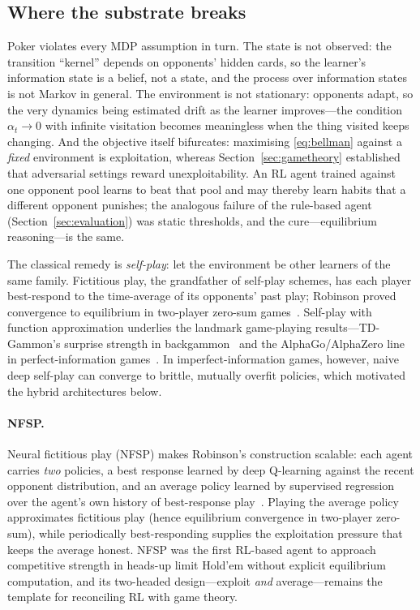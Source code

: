 \subsection{Where the substrate breaks}

Poker violates every MDP assumption in turn. The state is not observed: the transition ``kernel'' depends on opponents' hidden cards, so the learner's information state is a belief, not a state, and the process over information states is not Markov in general. The environment is not stationary: opponents adapt, so the very dynamics being estimated drift as the learner improves---the condition $\alpha_t \to 0$ with infinite visitation becomes meaningless when the thing visited keeps changing. And the objective itself bifurcates: maximising \eqref{eq:bellman} against a \emph{fixed} environment is exploitation, whereas Section~\ref{sec:gametheory} established that adversarial settings reward unexploitability. An RL agent trained against one opponent pool learns to beat that pool and may thereby learn habits that a different opponent punishes; the analogous failure of the rule-based agent (Section~\ref{sec:evaluation}) was static thresholds, and the cure---equilibrium reasoning---is the same.

The classical remedy is \emph{self-play}: let the environment be other learners of the same family. Fictitious play, the grandfather of self-play schemes, has each player best-respond to the time-average of its opponents' past play; Robinson proved convergence to equilibrium in two-player zero-sum games~\cite{robinson1951iterative}. Self-play with function approximation underlies the landmark game-playing results---TD-Gammon's surprise strength in backgammon~\cite{tesauro1995td} and the AlphaGo/AlphaZero line in perfect-information games~\cite{silver2017alphagozero}. In imperfect-information games, however, naive deep self-play can converge to brittle, mutually overfit policies, which motivated the hybrid architectures below.

\paragraph{NFSP.} Neural fictitious play (NFSP) makes Robinson's construction scalable: each agent carries \emph{two} policies, a best response learned by deep Q-learning against the recent opponent distribution, and an average policy learned by supervised regression over the agent's own history of best-response play~\cite{heinrich2016deep}. Playing the average policy approximates fictitious play (hence equilibrium convergence in two-player zero-sum), while periodically best-responding supplies the exploitation pressure that keeps the average honest. NFSP was the first RL-based agent to approach competitive strength in heads-up limit Hold'em without explicit equilibrium computation, and its two-headed design---exploit \emph{and} average---remains the template for reconciling RL with game theory.

